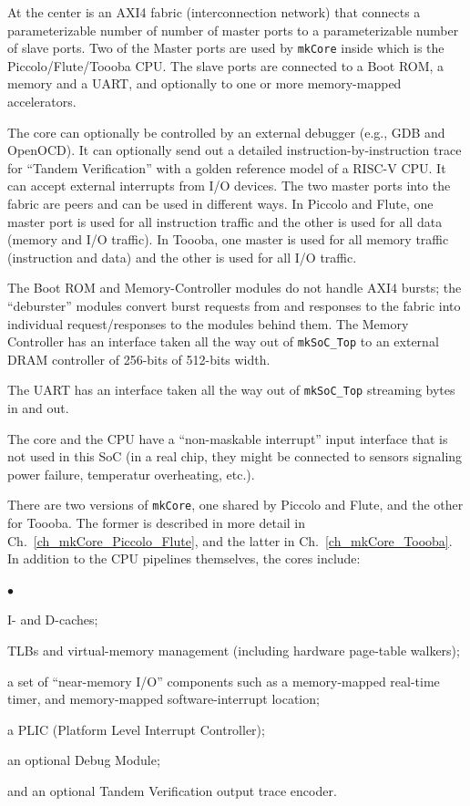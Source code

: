 \documentclass[11pt]{book}
\newenvironment{tightlist}%
{\begin{list}{$\bullet$}{%
    \setlength{\topsep}{0in}
    \setlength{\partopsep}{0in}
    \setlength{\itemsep}{0in}
    \setlength{\parsep}{0in}
    \setlength{\leftmargin}{1.5em}
    \setlength{\rightmargin}{0in}
    \setlength{\itemindent}{0in}
}
}%
{\end{list}
}
\newcommand{\cf}{\footnotesize\tt}
\begin{document}
At the center is an AXI4 fabric (interconnection network) that
connects a parameterizable number of number of master ports to a
parameterizable number of slave ports.  Two of the Master ports are
used by {\cf mkCore} inside which is the Piccolo/Flute/Toooba CPU.
The slave ports are connected to a Boot ROM, a memory and a UART, and
optionally to one or more memory-mapped accelerators.

The core can optionally be controlled by an external debugger (e.g.,
GDB and OpenOCD).  It can optionally send out a detailed
instruction-by-instruction trace for ``Tandem Verification'' with a
golden reference model of a RISC-V CPU.  It can accept external
interrupts from I/O devices.  The two master ports into the fabric are
peers and can be used in different ways.  In Piccolo and Flute, one
master port is used for all instruction traffic and the other is used
for all data (memory and I/O traffic).  In Toooba, one master is used
for all memory traffic (instruction and data) and the other is used
for all I/O traffic.

The Boot ROM and Memory-Controller modules do not handle AXI4 bursts;
the ``deburster'' modules convert burst requests from and responses to
the fabric into individual request/responses to the modules behind
them.  The Memory Controller has an interface taken all the way out of
{\cf mkSoC\_Top} to an external DRAM controller of 256-bits of
512-bits width.

The UART has an interface taken all the way out of {\cf mkSoC\_Top}
streaming bytes in and out.

The core and the CPU have a ``non-maskable interrupt'' input interface
that is not used in this SoC (in a real chip, they might be connected
to sensors signaling power failure, temperatur overheating, etc.).

There are two versions of {\cf mkCore}, one shared by Piccolo and
Flute, and the other for Toooba.  The former is described in more
detail in Ch.~\ref{ch_mkCore_Piccolo_Flute}, and the latter in
Ch.~\ref{ch_mkCore_Toooba}.  In addition to the CPU pipelines
themselves, the cores include:

\begin{tightlist}

\item I- and D-caches;

\item TLBs and virtual-memory management (including hardware page-table walkers);

\item a set of ``near-memory I/O'' components such as a memory-mapped
real-time timer, and memory-mapped software-interrupt location;

\item a PLIC (Platform Level Interrupt Controller);

\item an optional Debug Module;

\item and an optional Tandem Verification output trace encoder.

\end{tightlist}
\end{document}
